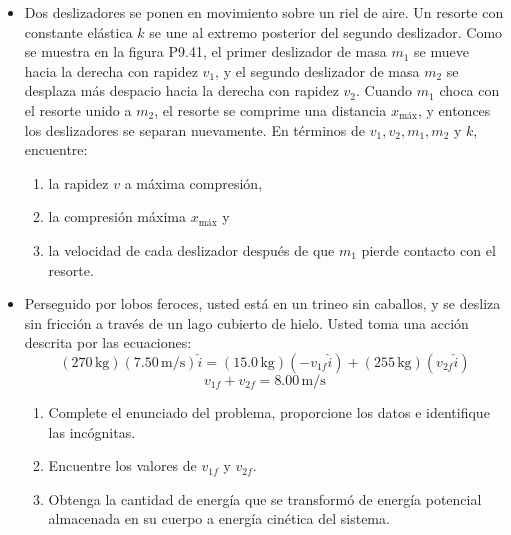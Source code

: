 \documentclass[11pt,a4paper]{article}
\begin{document}
\newpage

\begin{itemize}
    \item[\textbf{41.}] Dos deslizadores se ponen en movimiento sobre un riel de aire. Un resorte con constante elástica \(k\) se une al extremo posterior del segundo deslizador. Como se muestra en la figura P9.41, el primer deslizador de masa \(m_1\) se mueve hacia la derecha con rapidez \(v_1\), y el segundo deslizador de masa \(m_2\) se desplaza más despacio hacia la derecha con rapidez \(v_2\). Cuando \(m_1\) choca con el resorte unido a \(m_2\), el resorte se comprime una distancia \(x_{\text{máx}}\), y entonces los deslizadores se separan nuevamente. En términos de \(v_1, v_2, m_1, m_2\) y \(k\), encuentre:
    \begin{enumerate}
        \item la rapidez \(v\) a máxima compresión,
        \item la compresión máxima \(x_{\text{máx}}\) y
        \item la velocidad de cada deslizador después de que \(m_1\) pierde contacto con el resorte.
    \end{enumerate}
    \vspace*{7cm}

    \item[\textbf{42.}] Perseguido por lobos feroces, usted está en un trineo sin caballos, y se desliza sin fricción a través de un lago cubierto de hielo. Usted toma una acción descrita por las ecuaciones:
    \[
    (270\,\text{kg})(7.50\,\text{m/s})\hat{i} = (15.0\,\text{kg})(-v_{1f}\hat{i}) + (255\,\text{kg})(v_{2f}\hat{i})
    \]
    \[
    v_{1f} + v_{2f} = 8.00\,\text{m/s}
    \]
    \begin{enumerate}
        \item Complete el enunciado del problema, proporcione los datos e identifique las incógnitas.
        \item Encuentre los valores de \(v_{1f}\) y \(v_{2f}\).
        \item Obtenga la cantidad de energía que se transformó de energía potencial almacenada en su cuerpo a energía cinética del sistema.
    \end{enumerate}
    \vspace*{6cm}


\end{itemize}
\end{document}
